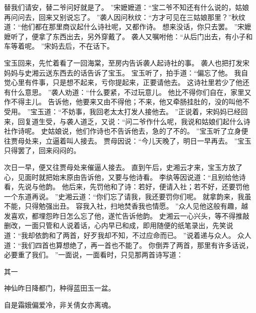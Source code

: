 替我们请安，替二爷问好就是了。
”宋嬷嬷道：“宝二爷不知还有什么说的，姑娘再问问去，回来又别说忘了。
”袭人因问秋纹：“方才可见在三姑娘那里？”秋纹道：“他们都在那里商议起什么诗社呢，又都作诗。
想来没话，你只去罢。
”宋嬷嬷听了，便拿了东西出去，另外穿戴了。
袭人又嘱咐他：“从后门出去，有小子和车等着呢。
”宋妈去后，不在话下。
\par
宝玉回来，先忙着看了一回海棠，至房内告诉袭人起诗社的事。
袭人也把打发宋妈妈与史湘云送东西去的话告诉了宝玉。
宝玉听了，拍手道：“偏忘了他。
我自觉心里有件事，只是想不起来，亏你提起来，正要请他去。
这诗社里若少了他还有什么意思。
”袭人劝道：“什么要紧，不过玩意儿。
他比不得你们自在，家里又作不得主儿。
告诉他，他要来又由不得他；不来，他又牵肠挂肚的，没的叫他不受用。
”宝玉道：“不妨事，我回老太太打发人接他去。
”正说着，宋妈妈已经回来，回复道生受，与袭人道乏，又说：“问二爷作什么呢，我说和姑娘们起什么诗社作诗呢。
史姑娘说，他们作诗也不告诉他去，急的了不的。
”宝玉听了立身便往贾母处来，立逼着叫人接去。
贾母因说：“今儿天晚了，明日一早再去。
”宝玉只得罢了，回来闷闷的。
\par
次日一早，便又往贾母处来催逼人接去。
直到午后，史湘云才来，宝玉方放了心，见面时就把始末原由告诉他，又要与他诗看。
李纨等因说道：“且别给他诗看，先说与他韵。
他后来，先罚他和了诗：若好，便请入社；若不好，还要罚他一个东道再说。
”史湘云道：“你们忘了请我，我还要罚你们呢。
就拿韵来，我虽不能，只得勉强出丑。
容我入社，扫地焚香我也情愿。
”众人见他这般有趣，越发喜欢，都埋怨昨日怎么忘了他，遂忙告诉他韵。
史湘云一心兴头，等不得推敲删改，一面只管和人说着话，心内早已和成，即用随便的纸笔录出，先笑说道：“我却依韵和了两首，好歹我却不知，不过应命而已。
”说着递与众人。
众人道：“我们四首也算想绝了，再一首也不能了。
你倒弄了两首，那里有许多话说，必要重了我们。
”一面说，一面看时，只见那两首诗写道：\par
\hop
其一\par
神仙昨日降都门，种得蓝田玉一盆。
\par
自是霜娥偏爱冷，非关倩女亦离魂。
